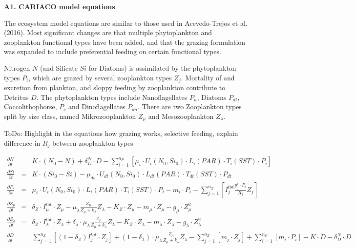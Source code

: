 \documentclass[11pt,letterpaper,english]{article}
\begin{document}
\newcommand{\etal}{{\em et al.}}
\newcommand{\ux}{{\underline{x}}}
\newcommand{\tdt}{{t}} 

{\bf {\large A1. CARIACO model equations}}

The ecosystem model equations are similar to those used in Acevedo-Trejos et al. (2016).
Most significant changes are that multiple phytoplankton and zooplankton functional types have been added, and that the grazing formulation was expanded to include preferential feeding on certain functional types.

Nitrogen $N$ (and Silicate $Si$ for Diatoms) is assimilated by the phytoplankton types $P_i$, which are grazed by several zooplankton types $Z_j$. Mortality of and excretion from plankton, and sloppy feeding by zooplankton contribute to Detritus $D$. The phytoplankton types include Nanoflagellates $P_{n}$, Diatoms $P_{dt}$, Coccolithophorse, $P_{c}$ and Dinoflagellates $P_{dn}$. There are two Zooplankton types split by size class, named Mikrozooplankton $Z_{\mu}$ and Mesozooplankton $Z_{\lambda}$.

ToDo:  
Highlight in the equations how grazing works, selective feeding, explain difference in $R_j$ between zooplankton types

\begin{eqnarray}
\frac{\partial N}{\partial t} & = & 
K \cdot \left(N_{0} - N\right) + 
\delta^{N}_{D} \cdot D -
\sum_{i=1}^{n_P} [\mu_i \cdot U_{i}(N_0,Si_0)\cdot L_i(PAR)\cdot T_i(SST) \cdot P_{i}] 
\nonumber  \\
\frac{\partial Si}{\partial t} & = & 
K \cdot \left(Si_{0} - Si\right) 
- \mu_{dt} \cdot U_{dt}(N_0,Si_0) \cdot L_{dt}(PAR)\cdot T_{dt}(SST) \cdot P_{dt}
\nonumber \\
\frac{\partial P_{i}}{\partial t} & = & 
\mu_{i} \cdot U_{i}(N_0,Si_0)\cdot L_{i}(PAR)\cdot T_{i}(SST) \cdot P_{i}
- m_{i} \cdot P_{i}
- \sum_{j=1}^{n_Z} [I^{tot}_j \frac{p^i_{j} \cdot P_{i}} {R_{j}} Z_{j}]
\nonumber \\
\frac{\partial Z_{\mu}}{\partial t} & = & 
\delta_Z \cdot I^{tot}_{\mu} \cdot Z_{\mu}-
\mu^{}_{\lambda} \frac{Z_{\mu}}{Z_{\mu}+k_{\lambda}} Z_{\lambda}-
K_{Z} \cdot Z_{\mu} -
m_{\mu} \cdot Z_{\mu} - 
g_{\mu} \cdot Z_{\mu}^{2}
\nonumber \\
\frac{\partial Z_{\lambda}}{\partial t} & = & 
\delta_Z \cdot I^{tot}_{\lambda} \cdot Z_{\lambda}+
\delta_{\lambda} \cdot \mu^{}_{\lambda} \frac{Z_{\mu}}{Z_{\mu}+k_{\lambda}} Z_{\lambda}-
K_{Z} \cdot Z_{\lambda} -
m_{\lambda} \cdot Z_{\lambda} - 
g_{\lambda} \cdot Z_{\lambda}^{2}
\nonumber \\
\frac{\partial D}{\partial t} & = & 
\sum_{j=1}^{n_Z} [(1-\delta_Z) I^{tot}_j \cdot Z_{j}] +
(1-\delta_{\lambda}) \cdot \mu^{}_{\lambda} \frac{Z_{\mu}}{Z_{\mu}+k_{\lambda}} Z_{\lambda}-
\sum_{j=1}^{n_Z} [m_j \cdot Z_{j}] +
\sum_{i=1}^{n_P} [m_i \cdot P_{i}] -
K \cdot D -
\delta^{N}_{D} \cdot D
\nonumber
\end{eqnarray}
 
\end{document}
